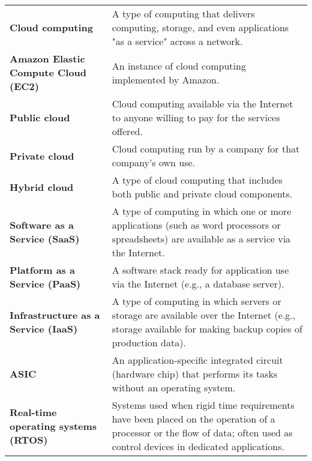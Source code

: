 \documentclass{article}
\begin{document}
\begin{tabular}{>{\raggedright}p{} >{\raggedright\arraybackslash}p{}}
\textbf{Cloud computing} & A type of computing that delivers computing, storage, and even applications "as a service" across a network. \\
\textbf{Amazon Elastic Compute Cloud (EC2)} & An instance of cloud computing implemented by Amazon. \\
\textbf{Public cloud} & Cloud computing available via the Internet to anyone willing to pay for the services offered. \\
\textbf{Private cloud} & Cloud computing run by a company for that company's own use. \\
\textbf{Hybrid cloud} & A type of cloud computing that includes both public and private cloud components. \\
\textbf{Software as a Service (SaaS)} & A type of computing in which one or more applications (such as word processors or spreadsheets) are available as a service via the Internet. \\
\textbf{Platform as a Service (PaaS)} & A software stack ready for application use via the Internet (e.g., a database server). \\
\textbf{Infrastructure as a Service (IaaS)} & A type of computing in which servers or storage are available over the Internet (e.g., storage available for making backup copies of production data). \\
\textbf{ASIC} & An application-specific integrated circuit (hardware chip) that performs its tasks without an operating system. \\
\textbf{Real-time operating systems (RTOS)} & Systems used when rigid time requirements have been placed on the operation of a processor or the flow of data; often used as control devices in dedicated applications. \\
\bottomrule
\end{tabular}
\vspace{\baselineskip}
\end{document}
